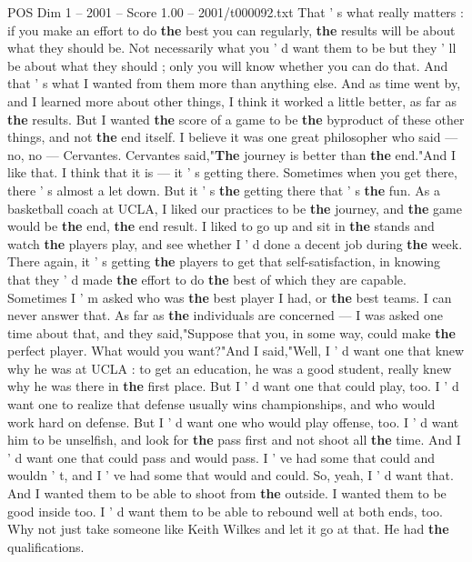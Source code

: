 \begin{textsample}{POS Dim 1 – 2001 – Score 1.00 – 2001/t000092.txt}
That ' s what really matters : if you make an effort to do \textbf{the} best you can regularly, \textbf{the} results will be about what they should be.
Not necessarily what you ' d want them to be but they ' ll be about what they should ; only you will know whether you can do that.
And that ' s what I wanted from them more than anything else.
And as time went by, and I learned more about other things, I think it worked a little better, as far as \textbf{the} results.
But I wanted \textbf{the} score of a game to be \textbf{the} byproduct of these other things, and not \textbf{the} end itself.
I believe it was one great philosopher who said — no, no — Cervantes.
Cervantes said,"\textbf{The} journey is better than \textbf{the} end."And I like that.
I think that it is — it ' s getting there.
Sometimes when you get there, there ' s almost a let down.
But it ' s \textbf{the} getting there that ' s \textbf{the} fun.
As a basketball coach at UCLA, I liked our practices to be \textbf{the} journey, and \textbf{the} game would be \textbf{the} end, \textbf{the} end result.
I liked to go up and sit in \textbf{the} stands and watch \textbf{the} players play, and see whether I ' d done a decent job during \textbf{the} week.
There again, it ' s getting \textbf{the} players to get that self-satisfaction, in knowing that they ' d made \textbf{the} effort to do \textbf{the} best of which they are capable.
Sometimes I ' m asked who was \textbf{the} best player I had, or \textbf{the} best teams.
I can never answer that.
As far as \textbf{the} individuals are concerned — I was asked one time about that, and they said,"Suppose that you, in some way, could make \textbf{the} perfect player.
What would you want?"And I said,"Well, I ' d want one that knew why he was at UCLA : to get an education, he was a good student, really knew why he was there in \textbf{the} first place.
But I ' d want one that could play, too.
I ' d want one to realize that defense usually wins championships, and who would work hard on defense.
But I ' d want one who would play offense, too.
I ' d want him to be unselfish, and look for \textbf{the} pass first and not shoot all \textbf{the} time.
And I ' d want one that could pass and would pass.
I ' ve had some that could and wouldn ' t, and I ' ve had some that would and could.
So, yeah, I ' d want that.
And I wanted them to be able to shoot from \textbf{the} outside.
I wanted them to be good inside too.
I ' d want them to be able to rebound well at both ends, too.
Why not just take someone like Keith Wilkes and let it go at that.
He had \textbf{the} qualifications.

\end{textsample}
